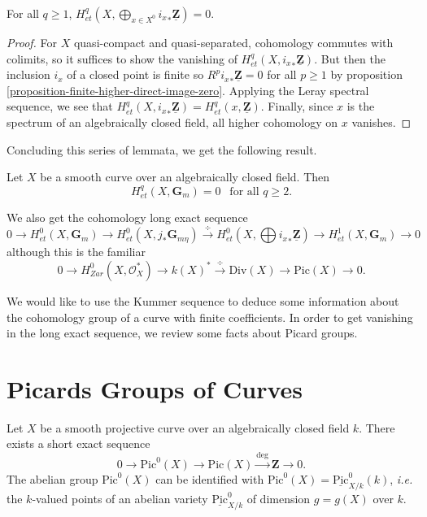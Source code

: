 \begin{lemma}
For all $q \geq 1$, $H_{et}^q(X, \bigoplus_{x \in X^0} {i_x}_* 
\underline{\mathbf{Z}}) = 0$.
\end{lemma}

\begin{proof}
For $X$ quasi-compact and quasi-separated, cohomology commutes with colimits, 
so it suffices to show the vanishing of $H_{et}^q(X, {i_x}_* 
\underline{\mathbf{Z}})$. But then the inclusion $i_x$ of a closed point is 
finite so $R^p {i_x}_* \underline{\mathbf{Z}} = 0$ for all $p \geq 1$ by 
proposition \ref{proposition-finite-higher-direct-image-zero}. Applying the Leray 
spectral sequence, we see that $H_{et}^q(X, {i_x}_* \underline{\mathbf{Z}}) = 
H_{et}^q(x, \underline{\mathbf{Z}})$. Finally, since $x$ is the spectrum of an 
algebraically closed field, all higher cohomology on $x$ vanishes.
\end{proof}

\noindent
Concluding this series of lemmata, we get the following result.

\begin{theorem}
Let $X$ be a smooth curve over an algebraically closed field. Then 
$$
H_{et}^q(X, \mathbf{G}_m) = 0 \ \ \text{ for all } q \geq 2.
$$
\end{theorem}

\noindent
We also get the cohomology long exact sequence
$$
0 \to H_{et}^0(X,\mathbf{G}_m) \to H_{et}^0(X,j_*\mathbf{G}_{m\eta}) 
\xrightarrow{\div} H_{et}^0(X,\bigoplus {i_x}_*\underline{\mathbf{Z}}) \to 
H_{et}^1(X,\mathbf{G}_m) \to 0
$$
although this is the familiar
$$
0 \to H_{Zar}^0(X,\mathcal{O}_X^*) \to k(X)^* \xrightarrow{\div} \text{Div}(X) 
\to \text{Pic}(X) \to 0.
$$

\medskip\noindent
We would like to use the Kummer sequence to deduce some information about the 
cohomology group of a curve with finite coefficients. In order to get vanishing 
in the long exact sequence, we review some facts about Picard groups.

\section{Picards Groups of Curves}
\label{section-pic-curves}

\noindent
Let $X$ be a smooth projective curve over an algebraically closed field $k$. 
There exists a short exact sequence
$$
0\to \text{Pic}^0(X) \to  \text{Pic}(X)\xrightarrow{\deg} \mathbf{Z} \to 0.
$$
The abelian group $\text{Pic}^0(X)$ can be identified with $\text{Pic}^0(X) = 
\underline{\text{Pic}}^0_{X/k}(k)$, {\it i.e.} the $k$-valued points of an 
abelian variety $\underline{\text{Pic}}^0_{X/k}$ of dimension $g=g(X)$ over 
$k$. 

